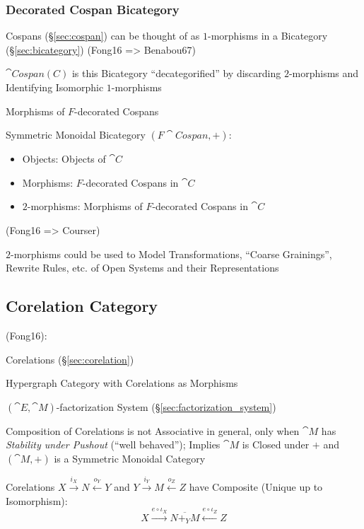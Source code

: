 \subsubsection{Decorated Cospan Bicategory}
\label{sec:decorated_cospan_bicategory}

Cospans (\S\ref{sec:cospan}) can be thought of as $1$-morphisms in a
Bicategory (\S\ref{sec:bicategory}) (Fong16 => Benabou67)

$\cat{Cospan(C)}$ is this Bicategory ``decategorified'' by discarding
$2$-morphisms and Identifying Isomorphic $1$-morphisms

Morphisms of $F$-decorated Cospans

Symmetric Monoidal Bicategory $(F\cat{Cospan}, +)$:
\begin{itemize}
  \item Objects: Objects of $\cat{C}$
  \item Morphisms: $F$-decorated Cospans in $\cat{C}$
  \item $2$-morphisms: Morphisms of $F$-decorated Cospans in $\cat{C}$
\end{itemize}

(Fong16 => Courser)

$2$-morphisms could be used to Model Transformations, ``Coarse
Grainings'', Rewrite Rules, etc. of Open Systems and their
Representations



\subsection{Corelation Category}\label{sec:corelation_category}

(Fong16):

Corelations (\S\ref{sec:corelation})

Hypergraph Category with Corelations as Morphisms

$(\cat{E},\cat{M})$-factorization System
(\S\ref{sec:factorization_system})

Composition of Corelations is not Associative in general, only when
$\cat{M}$ has \emph{Stability under Pushout} (``well behaved'');
Implies $\cat{M}$ is Closed under $+$ and $(\cat{M},+)$ is a Symmetric
Monoidal Category

Corelations $X \xrightarrow{i_X} N \xleftarrow{o_Y} Y$ and $Y
\xrightarrow{i_Y} M \xleftarrow{o_Z} Z$ have Composite (Unique up to
Isomorphism):
\[
  X \xrightarrow{e\circ\iota_X} \overline{N +_Y M}
    \xleftarrow{e\circ\iota_Z} Z
\]

